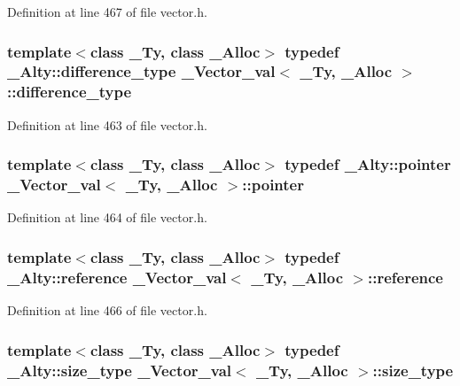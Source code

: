 Definition at line 467 of file vector.\+h.

\hypertarget{class___vector__val_ac80d6a645f27bc921bf30f5b0acdffb4}{
\subsubsection[{difference\+\_\+type}]{\setlength{\rightskip}{0pt plus 5cm}template$<$class \+\_\+\+Ty, class \+\_\+\+Alloc$>$ typedef \+\_\+\+Alty\+::difference\+\_\+type {\bf \+\_\+\+Vector\+\_\+val}$<$ \+\_\+\+Ty, \+\_\+\+Alloc $>$\+::{\bf difference\+\_\+type}}}\label{class___vector__val_ac80d6a645f27bc921bf30f5b0acdffb4}


Definition at line 463 of file vector.\+h.

\hypertarget{class___vector__val_ae6cca5a50b243bc20bd27fa8f620d63e}{
\subsubsection[{pointer}]{\setlength{\rightskip}{0pt plus 5cm}template$<$class \+\_\+\+Ty, class \+\_\+\+Alloc$>$ typedef \+\_\+\+Alty\+::pointer {\bf \+\_\+\+Vector\+\_\+val}$<$ \+\_\+\+Ty, \+\_\+\+Alloc $>$\+::{\bf pointer}}}\label{class___vector__val_ae6cca5a50b243bc20bd27fa8f620d63e}


Definition at line 464 of file vector.\+h.

\hypertarget{class___vector__val_a87f4bfea49b67e864cba8029a999eefe}{
\subsubsection[{reference}]{\setlength{\rightskip}{0pt plus 5cm}template$<$class \+\_\+\+Ty, class \+\_\+\+Alloc$>$ typedef \+\_\+\+Alty\+::reference {\bf \+\_\+\+Vector\+\_\+val}$<$ \+\_\+\+Ty, \+\_\+\+Alloc $>$\+::{\bf reference}}}\label{class___vector__val_a87f4bfea49b67e864cba8029a999eefe}


Definition at line 466 of file vector.\+h.

\hypertarget{class___vector__val_a46109be8e2eefdf86304a44e05074941}{
\subsubsection[{size\+\_\+type}]{\setlength{\rightskip}{0pt plus 5cm}template$<$class \+\_\+\+Ty, class \+\_\+\+Alloc$>$ typedef \+\_\+\+Alty\+::size\+\_\+type {\bf \+\_\+\+Vector\+\_\+val}$<$ \+\_\+\+Ty, \+\_\+\+Alloc $>$\+::{\bf size\+\_\+type}}}\label{class___vector__val_a46109be8e2eefdf86304a44e05074941}


